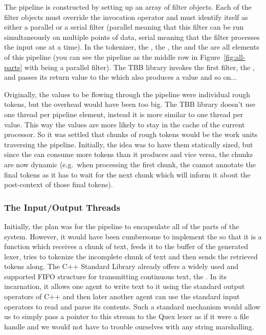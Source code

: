 The pipeline is constructed by setting up an array of filter objects. Each of
the filter objects must override the invocation operator and must identify
itself as either a parallel or a serial filter (parallel meaning that this
filter can be run simultaneously on multiple points of data, serial meaning
that the filter processes the input one at a time). In the tokenizer, the
, the , the 
and the  are all elements of this pipeline (you can see
the pipeline as the middle row in Figure~\ref{fig:all-parts} with
 being a parallel filter). The TBB library invokes the
first filter, the , and passes its return value to the
 which also produces a value and so on...

Originally, the values to be flowing through the pipeline were individual rough
tokens, but the overhead would have been too big. The TBB library doesn't use
one thread per pipeline element, instead it is more similar to one thread per
value. This way the values are more likely to stay in the cache of the current
processor. So it was settled that chunks of rough tokens would be the work
units traversing the pipeline. Initially, the idea was to have them statically
sized, but since the  can consume more tokens than it
produces and vice versa, the chunks are now dynamic (e.g.\ when processing the
first chunk, the  cannot annotate the final tokens as it has
to wait for the next chunk which will inform it about the post-context of those
final tokens).

\subsubsection{The Input/Output Threads}
\label{ssec:impl-parallel-io}

Initially, the plan was for the pipeline to encapsulate all of the parts of the
system. However, it would have been cumbersome to implement the
 so that it is a function which receives a chunk of text,
feeds it to the buffer of the generated lexer, tries to tokenize the incomplete
chunk of text and then sends the retrieved tokens along. The C++ Standard
Library already offers a widely used and supported FIFO structure for
transmitting continuous text, the . In its
 incarnation, it allows one agent to write text to it using
the standard output operators of C++ and then later another agent can use the
standard input operators to read and parse its contents. Such a standard
mechanism would allow us to simply pass a pointer to this stream to the Quex
lexer as if it were a file handle and we would not have to trouble ourselves
with any string marshalling.

